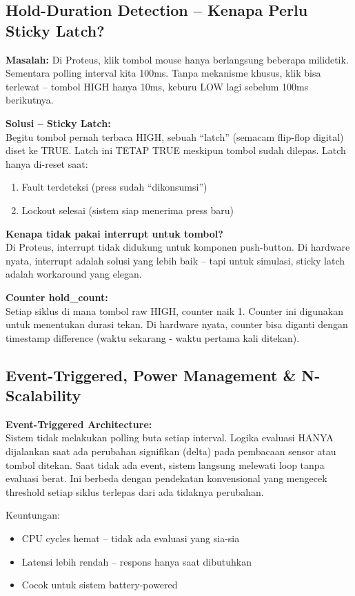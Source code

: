 \documentclass[12pt,a4paper]{article}
\begin{document}
\subsection{Hold-Duration Detection -- Kenapa Perlu Sticky Latch?}

\textbf{Masalah:} Di Proteus, klik tombol mouse hanya berlangsung beberapa milidetik.
Sementara polling interval kita 100ms. Tanpa mekanisme khusus, klik bisa terlewat
-- tombol HIGH hanya 10ms, keburu LOW lagi sebelum 100ms berikutnya.

\textbf{Solusi -- Sticky Latch:}\\
Begitu tombol pernah terbaca HIGH, sebuah ``latch'' (semacam flip-flop digital)
diset ke TRUE. Latch ini TETAP TRUE meskipun tombol sudah dilepas. Latch hanya
di-reset saat:
\begin{enumerate}[nosep]
    \item Fault terdeteksi (press sudah ``dikonsumsi'')
    \item Lockout selesai (sistem siap menerima press baru)
\end{enumerate}

\textbf{Kenapa tidak pakai interrupt untuk tombol?}\\
Di Proteus, interrupt tidak didukung untuk komponen push-button. Di hardware
nyata, interrupt adalah solusi yang lebih baik -- tapi untuk simulasi, sticky
latch adalah workaround yang elegan.

\textbf{Counter hold\_count:}\\
Setiap siklus di mana tombol raw HIGH, counter naik 1. Counter ini digunakan
untuk menentukan durasi tekan. Di hardware nyata, counter bisa diganti dengan
timestamp difference (waktu sekarang - waktu pertama kali ditekan).

\subsection{Event-Triggered, Power Management \& N-Scalability}

\textbf{Event-Triggered Architecture:}\\
Sistem tidak melakukan polling buta setiap interval. Logika evaluasi HANYA
dijalankan saat ada perubahan signifikan (delta) pada pembacaan sensor atau
tombol ditekan. Saat tidak ada event, sistem langsung melewati loop tanpa
evaluasi berat. Ini berbeda dengan pendekatan konvensional yang mengecek
threshold setiap siklus terlepas dari ada tidaknya perubahan.

Keuntungan:
\begin{itemize}[nosep]
    \item CPU cycles hemat -- tidak ada evaluasi yang sia-sia
    \item Latensi lebih rendah -- respons hanya saat dibutuhkan
    \item Cocok untuk sistem battery-powered
\end{itemize}
\end{document}
